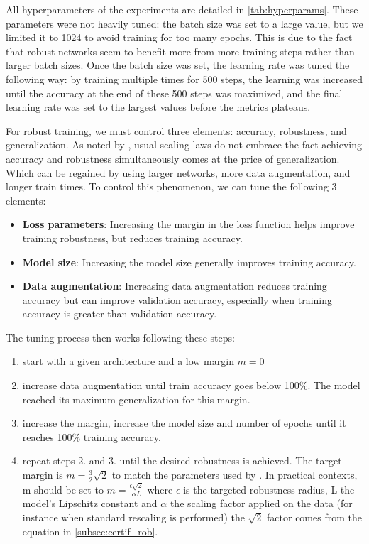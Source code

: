     
    

All hyperparameters of the experiments are detailed in \cref{tab:hyperparams}. These parameters were not heavily tuned: the batch size was set to a large value, but we limited it to 1024 to avoid training for too many epochs. This is due to the fact that robust networks seem to benefit more from more training steps rather than larger batch sizes. Once the batch size was set, the learning rate was tuned the following way: by training multiple times for 500 steps, the learning was increased until the accuracy at the end of these 500 steps was maximized, and the final learning rate was set to the largest values before the metrics plateaus.

For robust training, we must control three elements: accuracy, robustness, and generalization. As noted by \cite{prach2024intriguing, bethune_pay_2022}, usual scaling laws do not embrace the fact achieving accuracy and robustness simultaneously comes at the price of generalization. Which can be regained by using larger networks, more data augmentation, and longer train times. To control this phenomenon, we can tune the following 3 elements:
    \begin{itemize}
        \item \textbf{Loss parameters}: Increasing the margin in the loss function helps improve training robustness, but reduces training accuracy.
        \item \textbf{Model size}: Increasing the model size generally improves training accuracy.
        \item \textbf{Data augmentation}: Increasing data augmentation reduces training accuracy but can improve validation accuracy, especially when training accuracy is greater than validation accuracy.
    \end{itemize}

The tuning process then works following these steps:
\begin{enumerate}
    \item start with a given architecture and a low margin $m=0$
    \item increase data augmentation until train accuracy goes below 100\%. The model reached its maximum generalization for this margin.
    \item increase the margin, increase the model size and number of epochs until it reaches 100\% training accuracy.
    \item repeat steps 2. and 3. until the desired robustness is achieved. The target margin is $m=\frac{3}{2}\sqrt{2}$ to match the parameters used by \cite{araujo_unified_2023}. In practical contexts, m should be set to $m = \frac{\epsilon \sqrt{2}}{\alpha L}$ where $\epsilon$ is the targeted robustness radius, L the model's Lipschitz constant and $\alpha$ the scaling factor applied on the data (for instance when standard rescaling is performed) the $\sqrt{2}$ factor comes from the equation in \cref{subsec:certif_rob}.
\end{enumerate}

